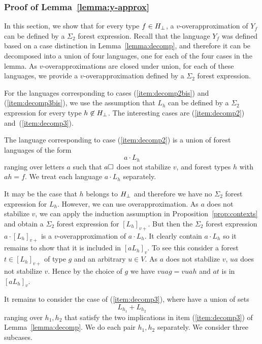 \documentclass{LMCS}
\begin{document}
\subsubsection{Proof of Lemma~\ref{lemma:y-approx}}
\label{sec:proof-lemma-y}
In this section, we show that for every type $f \in {H_\bot}$,
a $v$-overapproximation of $Y_f$ can be defined by a $\Sigma_2$ forest
expression. Recall that the language $Y_f$ was defined based on a case
distinction in Lemma~\ref{lemma:decomp}, and therefore it can be decomposed into a union of four languages, one for each of the four cases in the lemma.  As
$v$-overapproximations are closed under union, for each of these
languages, we provide a $v$-overapproximation defined by a $\Sigma_2$
forest expression.



For the languages corresponding to cases (\ref{item:decomp2bis}) and (\ref{item:decomp3bis}), we use the assumption that $L_h$ can be defined by a $\Sigma_2$ expression for every type $h \not \in {H_\bot}$. The interesting cases are (\ref{item:decomp2}) and~(\ref{item:decomp3}).


The language corresponding to  case (\ref{item:decomp2}) is a union of forest languages of the form
\begin{equation}
 \label{eq:case2}
 a  \cdot  L_h  
\end{equation}
ranging over letters $a$ such that  $a\Box$ does not stabilize
   $v$,  and forest types $h$ with $ah=f$. We treat each language $a \cdot L_h$ separately.

It may be the case that $h$ belongs to ${H_\bot}$ and therefore we
have no $\Sigma_2$ forest expression for $L_h$. However, we can
use overapproximation.  As $a$ does not stabilize $v$, we can apply
the induction assumption in Proposition~\ref{prop:contexts} and obtain
a $\Sigma_2$ forest expression for $[L_h]_{v+}$.  But then the
$\Sigma_2$ forest expression  $ a \cdot [L_h]_{v+} $ is
a $v$-overapproximation of $a \cdot L_h$. It clearly contain $a \cdot L_h$ so
it remains to show that it is included in $[aL_h]_v$. To see this consider a forest $t \in
[L_h]_{v+}$ of type $g$ and an arbitrary $u \in V$. As $a$ does not stabilize
$v$, $ua$ does not stabilize $v$. Hence by the choice of $g$ we have
$vuag=vuah$ and $at$ is in $[aL_h]_v$.






It remains to consider the case of  (\ref{item:decomp3}),
where have a union of sets
\begin{equation}
 \label{eq:case3a}
 L_{h_1} + L_{h_2} 
\end{equation}
ranging over $h_1,h_2$ that satisfy the two implications in item (\ref{item:decomp3}) of  Lemma~\ref{lemma:decomp}. We do each pair $h_1,h_2$ separately. 
We consider three subcases.
\end{document}
